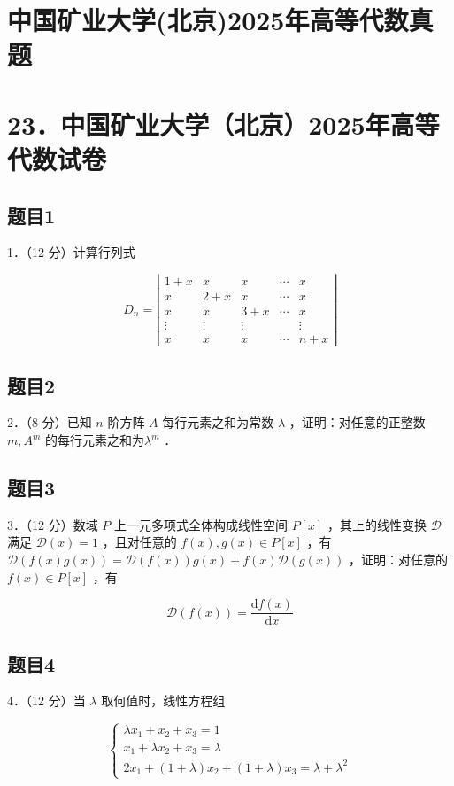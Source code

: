 \documentclass{article}
\begin{document}
\section*{中国矿业大学(北京)2025年高等代数真题}
\section*{23．中国矿业大学（北京）2025年高等代数试卷}

\subsection{题目1}
1．（12 分）计算行列式

\[
D_{n}=\left|\begin{array}{ccccc}
1+x & x & x & \cdots & x \\
x & 2+x & x & \cdots & x \\
x & x & 3+x & \cdots & x \\
\vdots & \vdots & \vdots & & \vdots \\
x & x & x & \cdots & n+x
\end{array}\right|
\]

\subsection{题目2}
2．（8 分）已知 \(n\) 阶方阵 \(A\) 每行元素之和为常数 \(\lambda\) ，证明：对任意的正整数 \(m, A^{m}\) 的每行元素之和为\(\lambda^{m}\) ．

\subsection{题目3}
3．（12 分）数域 \(P\) 上一元多项式全体构成线性空间 \(P[x]\) ，其上的线性变换 \(\mathcal{D}\) 满足 \(\mathcal{D}(x)=1\) ，且对任意的 \(f(x), g(x) \in P[x]\) ，有 \(\mathcal{D}(f(x) g(x))=\mathcal{D}(f(x)) g(x)+f(x) \mathcal{D}(g(x))\) ，证明：对任意的\(f(x) \in P[x]\) ，有

\[
\mathcal{D}(f(x))=\frac{\mathrm{d} f(x)}{\mathrm{d} x}
\]

\subsection{题目4}
4．（12 分）当 \(\lambda\) 取何值时，线性方程组

\[
\left\{\begin{array}{l}
\lambda x_{1}+x_{2}+x_{3}=1 \\
x_{1}+\lambda x_{2}+x_{3}=\lambda \\
2 x_{1}+(1+\lambda) x_{2}+(1+\lambda) x_{3}=\lambda+\lambda^{2}
\end{array}\right.
\]
\end{document}

